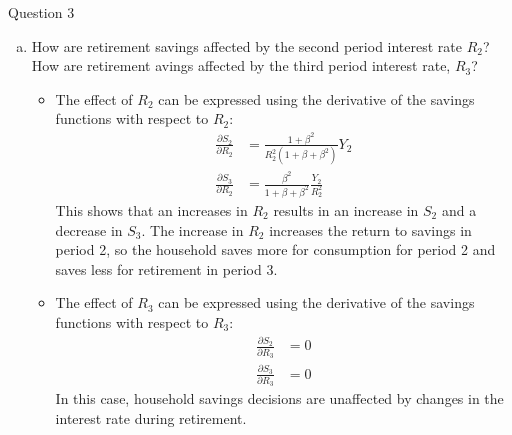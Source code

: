 \documentclass[a4paper]{article}
\begin{document}
\begin{questionbox}{Question 3}
\begin{enumerate}[(a)]
\begin{explanationbox}
\begin{itemize}
				\end{itemize}
			\end{explanationbox}
			\item How are retirement savings affected by the second period interest rate \( R_2 \)? How are retirement avings affected by the third period interest rate, \( R_3 \)?
			\begin{explanationbox}
				\begin{itemize}
					\item The effect of \( R_2 \) can be expressed using the derivative of the savings functions with respect to \( R_2 \):
					\begin{align*}
						\frac{\partial S_2}{\partial R_2} &= \frac{1 + \beta^2}{R_2^2 (1 + \beta + \beta^2)}Y_2\\
						\frac{\partial S_3}{\partial R_2} &= \frac{\beta^2}{1 + \beta + \beta^2}\frac{Y_2}{R_2^2}
					\end{align*}
					This shows that an increases in \( R_2 \) results in an increase in \( S_2 \) and a decrease in \( S_3 \). The increase in \( R_2 \) increases the return to savings in period 2, so the household saves more for consumption for period 2 and saves less for retirement in period 3.
				\end{itemize}
			\end{explanationbox}
			\begin{explanationbox}
				\begin{itemize}
					\item The effect of \( R_3 \) can be expressed using the derivative of the savings functions with respect to \( R_3 \):
					\begin{align*}
						\frac{\partial S_2}{\partial R_3} &= 0\\
						\frac{\partial S_3}{\partial R_3} &= 0
					\end{align*}
					In this case, household savings decisions are unaffected by changes in the interest rate during retirement.
				\end{itemize}
			\end{explanationbox}
		\end{enumerate}
	\end{questionbox}
\end{document}
